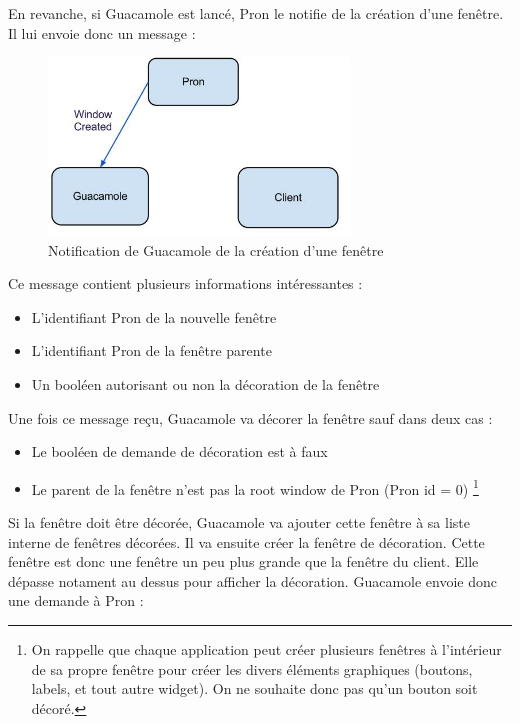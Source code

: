En revanche, si Guacamole est lancé, Pron le notifie de la création d'une fenêtre.
Il lui envoie donc un message :

\begin{figure}[H]
  \centering
  \includegraphics[width=8cm]{images/Guacamole_anim_3.jpg}
  \caption{Notification de Guacamole de la création d'une fenêtre}
  \label{fig:guacamole_anim_3}
\end{figure}

Ce message contient plusieurs informations intéressantes :

\begin{itemize}
  \item L'identifiant Pron de la nouvelle fenêtre
  \item L'identifiant Pron de la fenêtre parente
  \item Un booléen autorisant ou non la décoration de la fenêtre
\end{itemize}

Une fois ce message reçu, Guacamole va décorer la fenêtre sauf dans deux cas :

\begin{itemize}
  \item Le booléen de demande de décoration est à faux
  \item Le parent de la fenêtre n'est pas la root window de Pron (Pron id = 0)
            \footnote{On rappelle que chaque application peut créer plusieurs fenêtres à l'intérieur de sa propre fenêtre pour créer les divers éléments graphiques (boutons, labels, et tout autre widget). On ne souhaite donc pas qu'un bouton soit décoré.} 
\end{itemize}

Si la fenêtre doit être décorée, Guacamole va ajouter cette fenêtre à sa liste interne de fenêtres décorées.
Il va ensuite créer la fenêtre de décoration.
Cette fenêtre est donc une fenêtre un peu plus grande que la fenêtre du client.
Elle dépasse notament au dessus pour afficher la décoration.
Guacamole envoie donc une demande à Pron :

